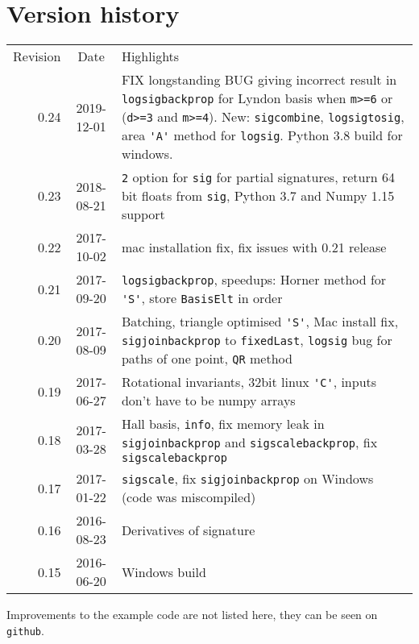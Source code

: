 \documentclass[a4paper]{extarticle}
\begin{document}
\section{Version history}
\begin{tabular}{rcp{}}
Revision&Date&Highlights\\[2mm]
0.24&2019-12-01&FIX longstanding BUG giving incorrect result in \verb|logsigbackprop| for Lyndon basis when \texttt{m>=6} or (\texttt{d>=3} and \texttt{m>=4}).
New: \verb|sigcombine|, \verb|logsigtosig|, area \verb|'A'| method for \verb|logsig|. Python 3.8 build for windows.\\
0.23&2018-08-21&\verb|2| option for \verb|sig| for partial signatures, return 64 bit floats from \verb|sig|, Python 3.7 and Numpy 1.15 support\\
0.22&2017-10-02&mac installation fix, fix issues with 0.21 release\\ %
0.21&2017-09-20&\verb|logsigbackprop|, %
speedups: Horner method for \verb|'S'|, store \verb|BasisElt| in order\\
0.20&2017-08-09&Batching, triangle optimised \verb|'S'|, Mac install fix, \verb|sigjoinbackprop| to \verb|fixedLast|, \verb|logsig| bug for paths of one point, \verb|QR| method\\
0.19&2017-06-27&Rotational invariants, 32bit linux \verb|'C'|, inputs don't have to be numpy arrays\\
0.18&2017-03-28&Hall basis, \verb|info|, fix memory leak in \verb|sigjoinbackprop| and \verb|sigscalebackprop|, fix \verb|sigscalebackprop|\\%
0.17&2017-01-22&\verb|sigscale|, fix \verb|sigjoinbackprop| on Windows (code was miscompiled)\\%
0.16&2016-08-23&Derivatives of signature%
\\
0.15&2016-06-20&Windows build\\
\end{tabular}
Improvements to the example code are not listed here, they can be seen on \verb|github|.
\printindex

\printbibliography[heading=bibintoc]
\end{document}
